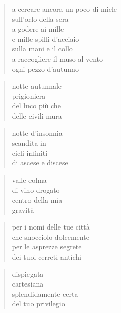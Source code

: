 \begin{verse}
    a cercare ancora un poco di miele\\
    sull'orlo della sera\\
    a godere ai mille\\
    e mille spilli d'acciaio\\
    sulla mani e il collo\\
    a raccogliere il muso al vento\\
    ogni pezzo d'autunno
\end{verse}

\clearpage


\begin{verse}
    notte autunnale\\
    prigioniera\\
    del luco più che\\
    delle civili mura
\end{verse}

\begin{verse}
    notte d'insonnia\\
    scandita in\\
    cicli infiniti\\
    di ascese e discese 
\end{verse}

\begin{verse}
    valle colma\\
    di vino drogato\\
    centro della mia\\
    gravità
\end{verse}

\clearpage


\begin{verse}
    per i nomi delle tue città\\
    che snocciolo dolcemente\\
    per le asprezze segrete\\
    dei tuoi cerreti antichi
\end{verse}

\begin{verse}
    dispiegata\\
    cartesiana\\
    splendidamente certa\\
    del tuo privilegio
\end{verse}

